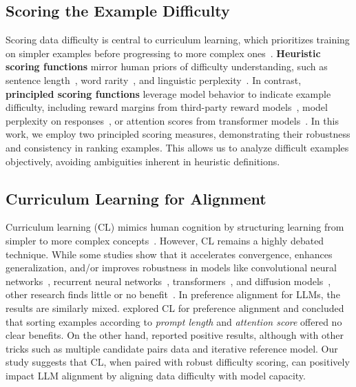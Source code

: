 \subsection{Scoring the Example Difficulty}
Scoring data difficulty is central to curriculum learning, which prioritizes training on simpler examples before progressing to more complex ones~\cite{bengio2009curriculum}. \textbf{Heuristic scoring functions} mirror human priors of difficulty understanding, such as sentence length~\cite{spitkovsky2010baby,tay2019simple,nagatsuka2023length}, word rarity~\cite{chang2021does}, and linguistic perplexity~\cite{campos2021curriculum}. In contrast, \textbf{principled scoring functions} leverage model behavior to indicate example difficulty, including reward margins from third-party reward models~\cite{croitoru2024curriculum}, model perplexity on responses~\cite{wu2024curriculum}, or attention scores from transformer models~\cite{kim2024strategic}.
In this work, we employ two principled scoring measures, demonstrating their robustness and consistency in ranking examples. This allows us to analyze difficult examples objectively, avoiding ambiguities inherent in heuristic definitions.

\subsection{Curriculum Learning for Alignment} Curriculum learning (CL) mimics human cognition by structuring learning from simpler to more complex concepts~\citep{avrahami1997teaching,bengio2009curriculum}. However, CL remains a highly debated technique. While some studies show that it accelerates convergence, enhances generalization, and/or improves robustness in models like convolutional neural networks~\citep{jiang2014easy,tudor2016hard}, recurrent neural networks~\citep{zaremba2014learning,sachan2016easy}, transformers~\citep{platanios2019competence}, and diffusion models~\citep{croitoru2023reverse}, other research finds little or no benefit~\citep{platanios2019competence,campos2021curriculum,wucurricula}. 
In preference alignment for LLMs, the results are similarly mixed. \citet{kim2024strategic} explored CL for preference alignment and concluded that sorting examples according to \textit{prompt length} and \textit{attention score} offered no clear benefits. On the other hand, \citet{pattnaik2024curry} reported positive results, although with other tricks such as multiple candidate pairs data and iterative reference model. Our study suggests that CL, when paired with robust difficulty scoring, can positively impact LLM alignment by aligning data difficulty with model capacity.

